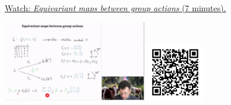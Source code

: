 
\begin{minipage}{10cm}
    \href{https://act4e-spring21.netlify.app/videos/spring2021-nat-trafos:natural-trafos:eq-maps-gr-actions.html}{Watch: \emph{Equivariant maps between group actions} (7 minutes).}
        
    \href{https://act4e-spring21.netlify.app/videos/spring2021-nat-trafos:natural-trafos:eq-maps-gr-actions.html}{\includegraphics[height=3.5cm]{spring2021-nat-trafos:natural-trafos:eq-maps-gr-actions/thumbnails.jpg}}
    \href{https://act4e-spring21.netlify.app/videos/spring2021-nat-trafos:natural-trafos:eq-maps-gr-actions.html}{\includegraphics[height=2.5cm]{spring2021-nat-trafos:natural-trafos:eq-maps-gr-actions/qrcode.png}}
\end{minipage}
